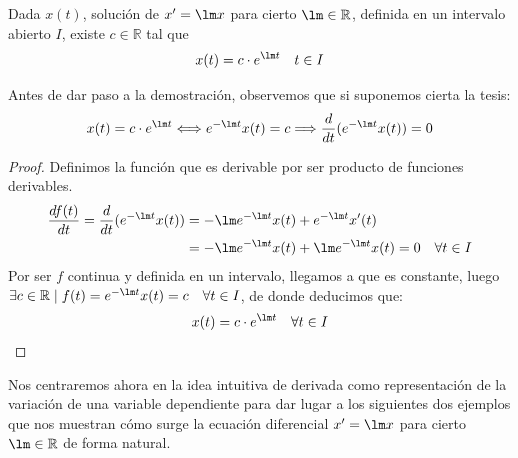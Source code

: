 \begin{prop}
    Dada $x(t)$, solución de $x'=\lm x$ para cierto $\lm \in \mathbb{R}$, definida en un intervalo abierto $I$, existe $c\in \mathbb{R}$ tal que
    \begin{equation*}
        x(t) = c \cdot e^{\lm t} \quad t\in I
    \end{equation*}
\end{prop}
Antes de dar paso a la demostración, observemos que si suponemos cierta la tesis:
\begin{equation*}
    x(t) = c \cdot e^{\lm t} \Longleftrightarrow  e^{-\lm t} x(t) = c \Longrightarrow \dfrac{d}{dt}(e^{-\lm t}x(t)) = 0
\end{equation*}
\begin{proof}
    Definimos la función
    que es derivable por ser producto de funciones derivables.
    \begin{align*}
        \dfrac{df(t)}{dt} = \dfrac{d}{dt}(e^{-\lm t}x(t)) &= -\lm e^{-\lm t} x(t) + e^{-\lm t} x'(t)\\
                          &= -\lm e^{-\lm t}x(t) + \lm e^{-\lm t}x(t) = 0 \quad \forall t\in I
    \end{align*}
    Por ser $f$ continua y definida en un intervalo, llegamos a que es constante, luego $\exists c\in \mathbb{R} \mid f(t) = e^{-\lm t}x(t) = c \quad \forall t\in I$, de donde deducimos que:
    \begin{equation*}
        x(t) = c \cdot e^{\lm t} \quad \forall t\in I
    \end{equation*}
\end{proof}

Nos centraremos ahora en la idea intuitiva de derivada como representación de la variación de una variable dependiente para dar lugar a los siguientes dos ejemplos que nos muestran cómo surge la ecuación diferencial $x' = \lm x$ para cierto $\lm \in \mathbb{R}$ de forma natural.

